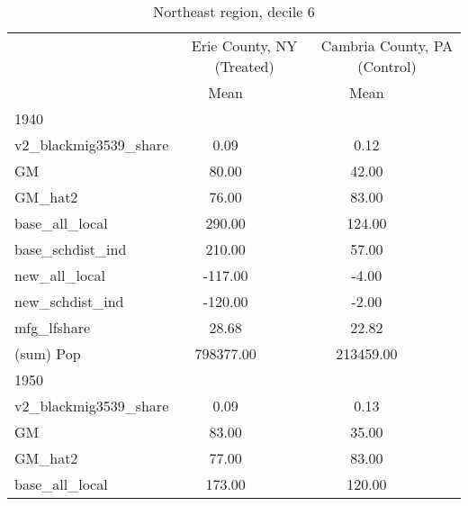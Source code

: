 \begin{table}[htbp]\centering
\def\sym#1{\ifmmode^{#1}\else\(^{#1}\)\fi}
\caption{Northeast region, decile 6 \label{tab1}}
\begin{tabular}{l*{2}{ccc}}
\toprule
                    &\multicolumn{3}{c}{Erie County, NY (Treated)}&\multicolumn{3}{c}{Cambria County, PA (Control)}\\
                    &        Mean&            &            &        Mean&            &            \\
\midrule
1940                &            &            &            &            &            &            \\
v2\_blackmig3539\_share&        0.09&            &            &        0.12&            &            \\
GM                  &       80.00&            &            &       42.00&            &            \\
GM\_hat2             &       76.00&            &            &       83.00&            &            \\
base\_all\_local      &      290.00&            &            &      124.00&            &            \\
base\_schdist\_ind    &      210.00&            &            &       57.00&            &            \\
new\_all\_local       &     -117.00&            &            &       -4.00&            &            \\
new\_schdist\_ind     &     -120.00&            &            &       -2.00&            &            \\
mfg\_lfshare         &       28.68&            &            &       22.82&            &            \\
(sum) Pop           &   798377.00&            &            &   213459.00&            &            \\
\midrule
1950                &            &            &            &            &            &            \\
v2\_blackmig3539\_share&        0.09&            &            &        0.13&            &            \\
GM                  &       83.00&            &            &       35.00&            &            \\
GM\_hat2             &       77.00&            &            &       83.00&            &            \\
base\_all\_local      &      173.00&            &            &      120.00&            &            \\

\end{tabular}
\end{table}
